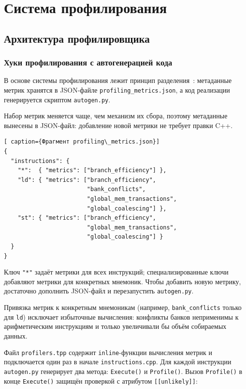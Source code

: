 \section{Система профилирования}

\subsection{Архитектура профилировщика}

\subsubsection{Хуки профилирования с автогенерацией кода}

В основе системы профилирования лежит принцип разделения~\cite{Kornyakov2010}: метаданные метрик хранятся в JSON-файле
\texttt{profiling\_metrics.json}, а код реализации генерируется скриптом \texttt{autogen.py}.

Набор метрик меняется чаще, чем механизм их сбора, поэтому метаданные
вынесены в JSON-файл: добавление новой метрики не требует правки C++.

\begin{lstlisting}[ caption={Фрагмент profiling\_metrics.json}]
{
  "instructions": {
    "*":  { "metrics": ["branch_efficiency"] },
    "ld": { "metrics": ["branch_efficiency",
                        "bank_conflicts",
                        "global_mem_transactions",
                        "global_coalescing"] },
    "st": { "metrics": ["branch_efficiency",
                        "global_mem_transactions",
                        "global_coalescing"] }
  }
}
\end{lstlisting}

Ключ \texttt{"*"} задаёт метрики для всех инструкций;
специализированные ключи добавляют метрики для конкретных мнемоник.
Чтобы добавить новую метрику, достаточно дополнить JSON-файл
и перезапустить \texttt{autogen.py}.

Привязка метрик к конкретным мнемоникам (например, \texttt{bank\_conflicts}
только для \texttt{ld}) исключает избыточные вычисления:
конфликты банков неприменимы к арифметическим инструкциям
и только увеличивали бы объём собираемых данных.

Файл \texttt{profilers.tpp} содержит \texttt{inline}-функции
вычисления метрик и подключается один раз в начале
\texttt{instructions.cpp}. Для каждой инструкции \texttt{autogen.py}
генерирует два метода: \texttt{Execute()} и \texttt{Profile()}.
Вызов \texttt{Profile()} в конце \texttt{Execute()} защищён
проверкой с атрибутом \texttt{[[unlikely]]}:

